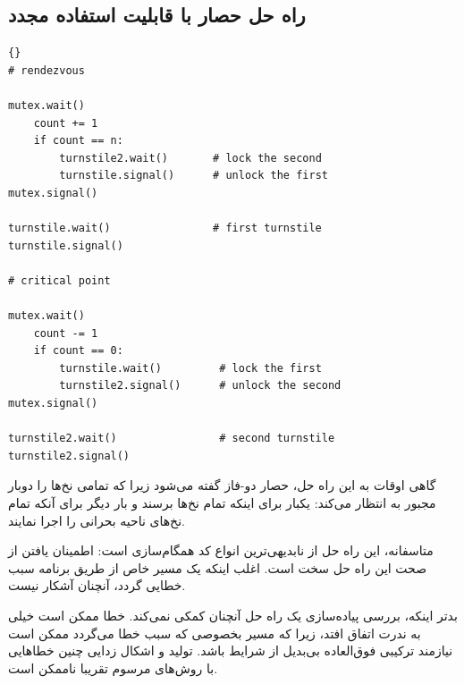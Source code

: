 \documentclass{book}
\begin{document}
\subsection {   راه حل حصار با قابلیت استفاده مجدد}


\begin{latin}
\begin{latin}
\begin{lstlisting}[title=\rl{{  راهنمای حصار با قابلیت استفاده مجدد}}]{} 
# rendezvous

mutex.wait()
    count += 1
    if count == n:
        turnstile2.wait()       # lock the second
        turnstile.signal()      # unlock the first
mutex.signal()

turnstile.wait()                # first turnstile
turnstile.signal()

# critical point

mutex.wait()
    count -= 1
    if count == 0: 
        turnstile.wait()         # lock the first
        turnstile2.signal()      # unlock the second
mutex.signal()

turnstile2.wait()                # second turnstile
turnstile2.signal()
\end{lstlisting}
\end{latin}
\end{latin}

    گاهی اوقات به این راه حل، حصار دو-فاز گفته می‌شود زیرا که تمامی نخ‌ها را دوبار مجبور به انتظار می‌کند: یکبار برای اینکه تمام نخ‌ها برسند و 
    بار دیگر برای آنکه تمام نخ‌های ناحیه بحرانی را اجرا نمایند. 

    متاسفانه، این راه حل  از نابدیهی‌ترین انواع کد همگام‌سازی است: اطمینان یافتن از صحت این راه حل سخت است. 
    اغلب اینکه یک مسیر خاص از طریق برنامه سبب خطایی گردد، آنچنان آشکار نیست.

    بدتر اینکه، بررسی پیاده‌سازی یک راه حل آنچنان کمکی نمی‌کند. خطا ممکن است خیلی به ندرت اتفاق افتد، 
    زیرا که مسیر بخصوصی که سبب خطا می‌گردد ممکن است نیازمند 
    ترکیبی فوق‌العاده بی‌بدیل از شرایط باشد. 
    تولید و اشکال زدایی چنین خطاهایی با روش‌های مرسوم تقریبا ناممکن است. 
    
\end{document}
